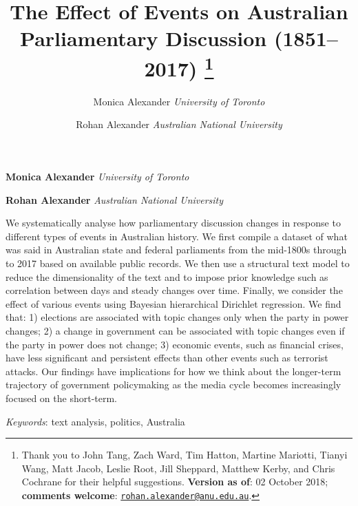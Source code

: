 \documentclass[12pt,]{article}
\title{The Effect of Events on Australian Parliamentary Discussion (1851--2017) \thanks{Thank you to John Tang, Zach Ward, Tim Hatton, Martine Mariotti, Tianyi
Wang, Matt Jacob, Leslie Root, Jill Sheppard, Matthew Kerby, and Chris
Cochrane for their helpful suggestions. \textbf{Version as of}: 02
October 2018; \textbf{comments welcome}:
\href{mailto:rohan.alexander@anu.edu.au}{\nolinkurl{rohan.alexander@anu.edu.au}}.}  }
\author{\Large Monica Alexander\vspace{0.05in} \newline\normalsize\emph{University of Toronto}   \and \Large Rohan Alexander\vspace{0.05in} \newline\normalsize\emph{Australian National University}  }
\date{}
\newcommand*{\authorfont}{\fontfamily{phv}\selectfont}
\renewenvironment{abstract}
 {{%
    \setlength{\leftmargin}{0mm}
    \setlength{\rightmargin}{\leftmargin}%
  }%
  \relax}
 {\endlist}
\theoremstyle{definition}
\theoremstyle{definition}
\theoremstyle{definition}
\theoremstyle{remark}
\begin{document}
	
%

{%
\setlength{\parindent}{0pt}
\thispagestyle{plain}
{\fontsize{18}{20}\selectfont\raggedright 
\maketitle  %

}

{
   \vskip 13.5pt\relax \normalsize\fontsize{11}{12} 
\textbf{\authorfont Monica Alexander} \hskip 15pt \emph{\small University of Toronto}   \par \textbf{\authorfont Rohan Alexander} \hskip 15pt \emph{\small Australian National University}   

}

}








\begin{abstract}

    \hbox{\vrule height .2pt width 39.14pc}

    \vskip 8.5pt %

\noindent We systematically analyse how parliamentary discussion changes in
response to different types of events in Australian history. We first
compile a dataset of what was said in Australian state and federal
parliaments from the mid-1800s through to 2017 based on available public
records. We then use a structural text model to reduce the
dimensionality of the text and to impose prior knowledge such as
correlation between days and steady changes over time. Finally, we
consider the effect of various events using Bayesian hierarchical
Dirichlet regression. We find that: 1) elections are associated with
topic changes only when the party in power changes; 2) a change in
government can be associated with topic changes even if the party in
power does not change; 3) economic events, such as financial crises,
have less significant and persistent effects than other events such as
terrorist attacks. Our findings have implications for how we think about
the longer-term trajectory of government policymaking as the media cycle
becomes increasingly focused on the short-term.


\vskip 8.5pt \noindent \emph{Keywords}: text analysis, politics, Australia \par

    \hbox{\vrule height .2pt width 39.14pc}



\end{abstract}
\end{document}
